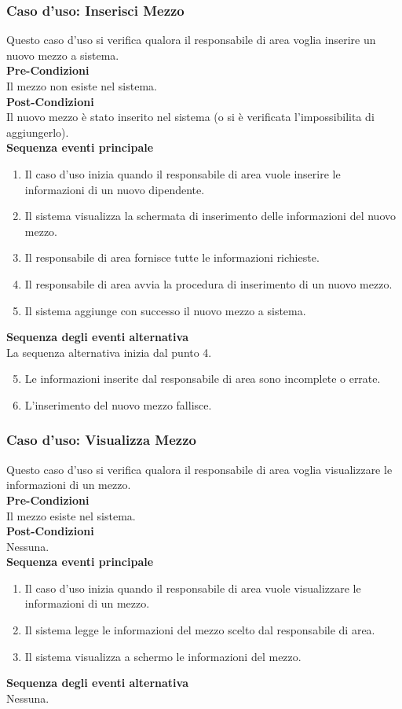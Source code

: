 \documentclass[green, fancy, 11pt]{elegantbook}
\begin{document}
\subsubsection{Caso d'uso: Inserisci Mezzo}
\noindent
Questo caso d’uso si verifica qualora il responsabile di area voglia inserire un nuovo mezzo a sistema.\\
\textbf{Pre-Condizioni}\\
Il mezzo non esiste nel sistema.\\
\textbf{Post-Condizioni}\\
Il nuovo mezzo è stato inserito nel sistema (o si è verificata l’impossibilita di aggiungerlo).\\
\textbf{Sequenza eventi principale}
\begin{enumerate}
	\item Il caso d’uso inizia quando il responsabile di area vuole inserire le informazioni di un nuovo dipendente.
	\item Il sistema visualizza la schermata di inserimento delle informazioni del nuovo mezzo.
	\item Il responsabile di area fornisce tutte le informazioni richieste.
	\item Il responsabile di area avvia la procedura di inserimento di un nuovo mezzo.
	\item Il sistema aggiunge con successo il nuovo mezzo a sistema.
\end{enumerate}
\textbf{Sequenza degli eventi alternativa}\\
La sequenza alternativa inizia dal punto 4.
\begin{enumerate}
	\setcounter{enumi}{4}
	\item Le informazioni inserite dal responsabile di area sono incomplete o errate.
	\item L’inserimento del nuovo mezzo fallisce.
\end{enumerate}
\newpage

\subsubsection{Caso d'uso: Visualizza Mezzo}
\noindent
Questo caso d’uso si verifica qualora il responsabile di area voglia visualizzare le informazioni di un mezzo.\\
\textbf{Pre-Condizioni}\\
Il mezzo esiste nel sistema.\\
\textbf{Post-Condizioni}\\
Nessuna.\\
\textbf{Sequenza eventi principale}
\begin{enumerate}
	\item Il caso d’uso inizia quando il responsabile di area vuole visualizzare le informazioni di un mezzo.
	\item Il sistema legge le informazioni del mezzo scelto dal responsabile di area.
	\item Il sistema visualizza a schermo le informazioni del mezzo.
\end{enumerate}
\textbf{Sequenza degli eventi alternativa}\\
Nessuna.
\end{document}
